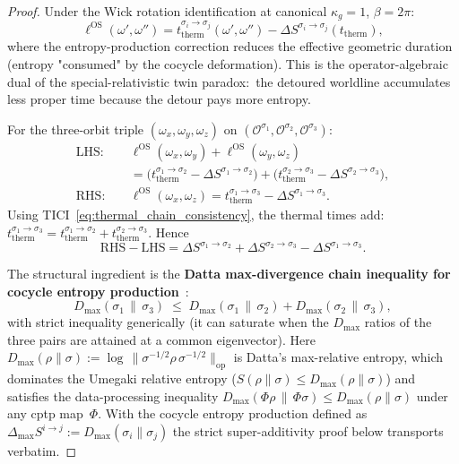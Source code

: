 \documentclass[11pt,a4paper]{article}
\theoremstyle{plain}
\theoremstyle{definition}
\newcommand{\Ocal}{\mathcal{O}}
\newcommand{\kappag}{\kappa_{g}}
\newcommand{\ellOS}{\ell^{\mathrm{OS}}}
\newcommand{\Oorb}[1]{\Ocal^{\sigma_{#1}}}
\newcommand{\DelS}[2]{\Delta S^{\sigma_{#1}\to\sigma_{#2}}}
\begin{document}
\begin{proof}
Under the Wick rotation identification at canonical $\kappag=1$,
$\beta=2\pi$:
\[
  \ellOS(\omega',\omega'') = t_{\mathrm{therm}}^{\sigma_{i}\to\sigma_{j}}(\omega',\omega'') - \DelS{i}{j}(t_{\mathrm{therm}}),
\]
where the entropy-production correction reduces the effective
geometric duration (entropy "consumed" by the cocycle deformation).
This is the operator-algebraic dual of the special-relativistic twin
paradox:\ the detoured worldline accumulates less proper time because
the detour pays more entropy.

For the three-orbit triple $(\omega_{x},\omega_{y},\omega_{z})$ on
$(\Oorb{1},\Oorb{2},\Oorb{3})$:
\begin{align*}
  \mathrm{LHS}: \quad &\ellOS(\omega_{x},\omega_{y})+\ellOS(\omega_{y},\omega_{z}) \\
  &= \big(t_{\mathrm{therm}}^{\sigma_{1}\to\sigma_{2}} - \DelS{1}{2}\big) + \big(t_{\mathrm{therm}}^{\sigma_{2}\to\sigma_{3}} - \DelS{2}{3}\big), \\
  \mathrm{RHS}: \quad &\ellOS(\omega_{x},\omega_{z}) = t_{\mathrm{therm}}^{\sigma_{1}\to\sigma_{3}} - \DelS{1}{3}.
\end{align*}
Using TICI~\eqref{eq:thermal_chain_consistency}, the thermal times
add:\ $t_{\mathrm{therm}}^{\sigma_{1}\to\sigma_{3}}=
t_{\mathrm{therm}}^{\sigma_{1}\to\sigma_{2}}+
t_{\mathrm{therm}}^{\sigma_{2}\to\sigma_{3}}$. Hence
\begin{equation}
  \mathrm{RHS}-\mathrm{LHS} = \DelS{1}{2}+\DelS{2}{3}-\DelS{1}{3}.
  \label{eq:deficit}
\end{equation}

The structural ingredient is the \textbf{Datta max-divergence chain
inequality for cocycle entropy production}~\cite{datta2009}:
\begin{equation}
  D_{\max}(\sigma_{1}\,\|\,\sigma_{3})
    \;\le\; D_{\max}(\sigma_{1}\,\|\,\sigma_{2})
        + D_{\max}(\sigma_{2}\,\|\,\sigma_{3}),
  \label{eq:lindblad_uhlmann}
\end{equation}
with strict inequality generically (it can saturate when the
$D_{\max}$ ratios of the three pairs are attained at a common
eigenvector). Here $D_{\max}(\rho\|\sigma) := \log\,\|\sigma^{-1/2}\rho\,\sigma^{-1/2}\|_{\mathrm{op}}$
is Datta's max-relative entropy, which dominates the Umegaki relative
entropy ($S(\rho\|\sigma) \le D_{\max}(\rho\|\sigma)$) and satisfies
the data-processing inequality
$D_{\max}(\Phi\rho\,\|\,\Phi\sigma) \le D_{\max}(\rho\|\sigma)$
under any cptp map~$\Phi$. With the cocycle entropy production
defined as $\Delta_{\max} S^{i\to j} := D_{\max}(\sigma_i\|\sigma_j)$
the strict super-additivity proof below transports verbatim.


\end{proof}
\end{document}

